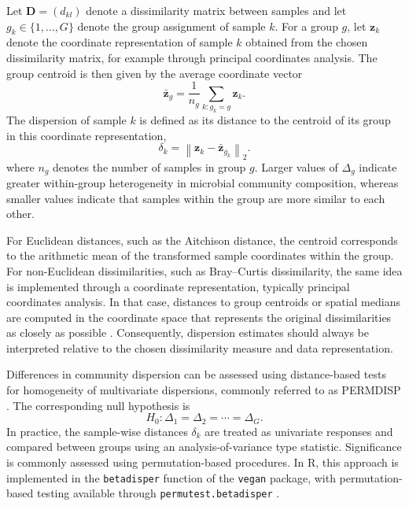 Let $\mathbf{D}=(d_{kl})$ denote a dissimilarity matrix between samples and let $g_k\in\{1,\ldots,G\}$ denote the group assignment of sample $k$. For a group $g$, let $\mathbf{z}_k$ denote the coordinate representation of sample $k$ obtained from the chosen dissimilarity matrix, for example through principal coordinates analysis. The group centroid is then given by the average coordinate vector
\begin{equation}
	\bar{\mathbf{z}}_g=\frac{1}{n_g}\sum_{k:g_k=g} \mathbf{z}_k.
\end{equation}
The dispersion of sample $k$ is defined as its distance to the centroid of its group in this coordinate representation,
\begin{equation}
	\delta_k=\left\|\mathbf{z}_k-\bar{\mathbf{z}}_{g_k}\right\|_2.
\end{equation}
where $n_g$ denotes the number of samples in group $g$. Larger values of $\Delta_g$ indicate greater within-group heterogeneity in microbial community composition, whereas smaller values indicate that samples within the group are more similar to each other.

For Euclidean distances, such as the Aitchison distance, the centroid corresponds to the arithmetic mean of the transformed sample coordinates within the group. For non-Euclidean dissimilarities, such as Bray--Curtis dissimilarity, the same idea is implemented through a coordinate representation, typically principal coordinates analysis. In that case, distances to group centroids or spatial medians are computed in the coordinate space that represents the original dissimilarities as closely as possible \citep{anderson2006distance}. Consequently, dispersion estimates should always be interpreted relative to the chosen dissimilarity measure and data representation.

Differences in community dispersion can be assessed using distance-based tests for homogeneity of multivariate dispersions, commonly referred to as PERMDISP \citep{anderson2006distance}. The corresponding null hypothesis is
\begin{equation}
H_0:\Delta_1=\Delta_2=\cdots=\Delta_G.
\end{equation}
In practice, the sample-wise distances $\delta_k$ are treated as univariate responses and compared between groups using an analysis-of-variance type statistic. Significance is commonly assessed using permutation-based procedures. In R, this approach is implemented in the \texttt{betadisper} function of the \texttt{vegan} package, with permutation-based testing available through \texttt{permutest.betadisper} \citep{oksanen2024vegan}.

